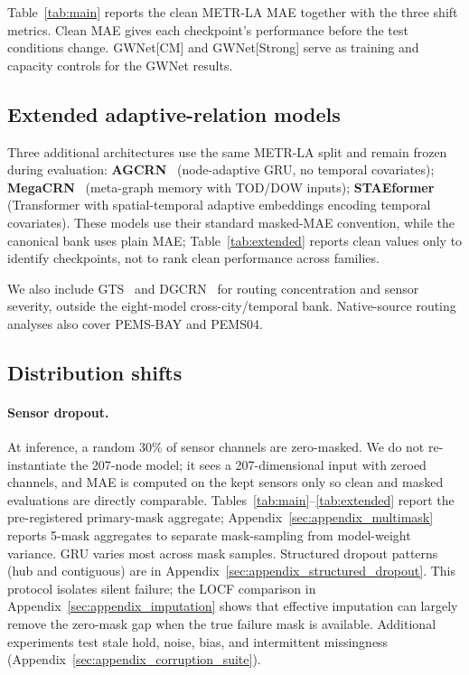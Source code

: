 Table~\ref{tab:main} reports the clean METR-LA MAE together with the three
shift metrics. Clean MAE gives each checkpoint's performance before the test conditions change. GWNet[CM] and GWNet[Strong] serve as training and capacity controls for the GWNet results.

\subsection{Extended adaptive-relation models}
\label{subsec:extended_models}

Three additional architectures use the same METR-LA split and remain frozen during evaluation:
\textbf{AGCRN}~\citep{bai2020agcrn} (node-adaptive GRU, no temporal
covariates); \textbf{MegaCRN}~\citep{jiang2023megacrn} (meta-graph memory
with TOD/DOW inputs); \textbf{STAEformer}~\citep{liu2023staeformer}
(Transformer with spatial-temporal adaptive embeddings encoding temporal
covariates). These models use their standard masked-MAE convention, while the
canonical bank uses plain MAE; Table~\ref{tab:extended} reports clean values
only to identify checkpoints, not to rank clean performance across families.

We also include GTS~\citep{shang2021discrete} and
DGCRN~\citep{li2023dgcrn} for routing concentration and sensor severity,
outside the eight-model cross-city/temporal bank. Native-source routing
analyses also cover PEMS-BAY and PEMS04.

\subsection{Distribution shifts}
\label{subsec:shifts}

\paragraph{Sensor dropout.}
At inference, a random 30\% of sensor channels are zero-masked. We do not
re-instantiate the 207-node model; it sees a 207-dimensional input with zeroed
channels, and MAE is computed on the kept sensors only so clean and masked
evaluations are directly comparable. Tables~\ref{tab:main}--\ref{tab:extended}
report the pre-registered primary-mask aggregate; Appendix~\ref{sec:appendix_multimask}
reports 5-mask aggregates to separate mask-sampling from model-weight variance.
GRU varies most across mask samples. Structured dropout patterns
(hub and contiguous) are in Appendix~\ref{sec:appendix_structured_dropout}.
This protocol isolates silent failure; the LOCF comparison in
Appendix~\ref{sec:appendix_imputation} shows that effective imputation can
largely remove the zero-mask gap when the true failure mask is available.
Additional experiments test stale hold, noise, bias, and intermittent missingness
(Appendix~\ref{sec:appendix_corruption_suite}).

